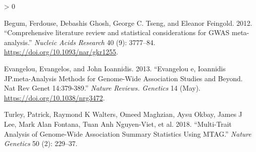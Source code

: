 \documentclass[
]{article}
\newlength{\cslhangindent}
\newenvironment{CSLReferences}[2] %
 {%
  \setlength{\parindent}{0pt}
  \ifodd #1 \everypar{\setlength{\hangindent}{\cslhangindent}}\ignorespaces\fi
  \ifnum #2 > 0
  \setlength{\parskip}{#2\baselineskip}
  \fi
 }%
 {}
\begin{document}
\setlength{\parindent}{-0.2in}
\setlength{\leftskip}{0.2in}
\setlength{\parskip}{8pt}

\noindent

\hypertarget{refs}{}
\begin{CSLReferences}{1}{0}
\leavevmode\hypertarget{ref-meta1}{}%
Begum, Ferdouse, Debashis Ghosh, George C. Tseng, and Eleanor Feingold.
2012. {``{Comprehensive literature review and statistical considerations
for GWAS meta-analysis}.''} \emph{Nucleic Acids Research} 40 (9):
3777--84. \url{https://doi.org/10.1093/nar/gkr1255}.

\leavevmode\hypertarget{ref-meta2}{}%
Evangelou, Evangelos, and John Ioannidis. 2013. {``Evangelou e,
Ioannidis JP.meta-Analysis Methods for Genome-Wide Association Studies
and Beyond. Nat Rev Genet 14:379-389.''} \emph{Nature Reviews. Genetics}
14 (May). \url{https://doi.org/10.1038/nrg3472}.

\leavevmode\hypertarget{ref-MTAG}{}%
Turley, Patrick, Raymond K Walters, Omeed Maghzian, Aysu Okbay, James J
Lee, Mark Alan Fontana, Tuan Anh Nguyen-Viet, et al. 2018.
{``Multi-Trait Analysis of Genome-Wide Association Summary Statistics
Using MTAG.''} \emph{Nature Genetics} 50 (2): 229--37.

\end{CSLReferences}
\end{document}
